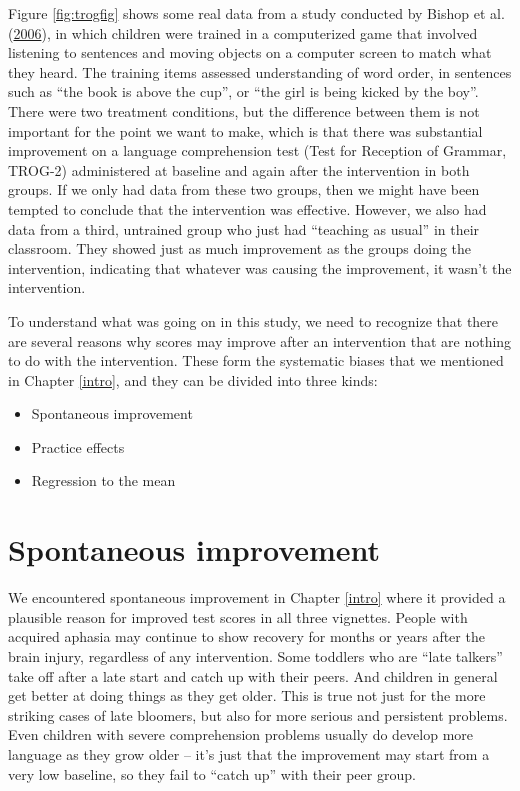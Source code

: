 \documentclass{krantz}
\providecommand{\tightlist}{%
\setlength{\itemsep}{0pt}\setlength{\parskip}{0pt}}
\begin{document}
Figure \ref{fig:trogfig} shows some real data from a study conducted by Bishop et al. (\protect\hyperlink{ref-bishop2006}{2006}), in which children were trained in a computerized game that involved listening to sentences and moving objects on a computer screen to match what they heard. The training items assessed understanding of word order, in sentences such as ``the book is above the cup'', or ``the girl is being kicked by the boy''. There were two treatment conditions, but the difference between them is not important for the point we want to make, which is that there was substantial improvement on a language comprehension test (Test for Reception of Grammar, TROG-2) administered at baseline and again after the intervention in both groups. If we only had data from these two groups, then we might have been tempted to conclude that the intervention was effective. However, we also had data from a third, untrained group who just had ``teaching as usual'' in their classroom. They showed just as much improvement as the groups doing the intervention, indicating that whatever was causing the improvement, it wasn't the intervention.

To understand what was going on in this study, we need to recognize that there are several reasons why scores may improve after an intervention that are nothing to do with the intervention. These form the systematic biases that we mentioned in Chapter \ref{intro}, and they can be divided into three kinds:

\begin{itemize}
\tightlist
\item
  Spontaneous improvement
\item
  Practice effects
\item
  Regression to the mean
\end{itemize}

\hypertarget{spontaneous-improvement}{%
\section{Spontaneous improvement}\label{spontaneous-improvement}}

We encountered spontaneous improvement in Chapter \ref{intro} where it provided a plausible reason for improved test scores in all three vignettes. People with acquired aphasia may continue to show recovery for months or years after the brain injury, regardless of any intervention. Some toddlers who are ``late talkers'' take off after a late start and catch up with their peers. And children in general get better at doing things as they get older. This is true not just for the more striking cases of late bloomers, but also for more serious and persistent problems. Even children with severe comprehension problems usually do develop more language as they grow older -- it's just that the improvement may start from a very low baseline, so they fail to ``catch up'' with their peer group.
\end{document}
